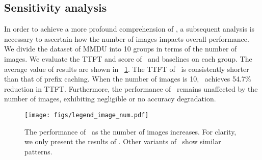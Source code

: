 \subsection{Sensitivity analysis}
In order to achieve a more profound comprehension of \sys, a subsequent analysis is necessary to ascertain how the number of images impacts overall performance. We divide the dataset of MMDU into 10 groups in terms of the number of images. We evaluate the TTFT and score of \sys~and baselines on each group. The average value of results are shown in \figurename~\ref{fig:10}. The TTFT of \sys~is consistently shorter than that of prefix caching. When the number of images is 10, \sys~achieves 54.7\% reduction in TTFT. Furthermore, the performance of \sys~remains unaffected by the number of images, exhibiting negligible or no accuracy degradation.
\begin{figure}[t]
    \centering
    \texttt{[image: figs/legend\_image\_num.pdf]}
    \vskip -0.2in
    \caption{The performance of \sys~as the number of images increases. For clarity, we only present the results of . Other variants of \sys~show similar patterns.}
    \label{fig:10}
\end{figure}


